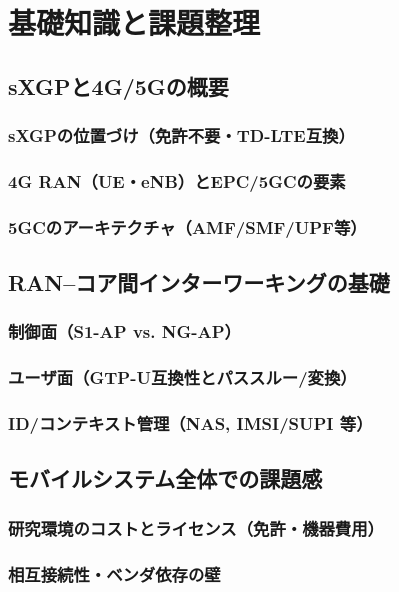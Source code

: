 \chapter{基礎知識と課題整理}
\label{chap:background}

\section{sXGPと4G/5Gの概要}
\subsection{sXGPの位置づけ（免許不要・TD-LTE互換）}
\subsection{4G RAN（UE・eNB）とEPC/5GCの要素}
\subsection{5GCのアーキテクチャ（AMF/SMF/UPF等）}

\section{RAN–コア間インターワーキングの基礎}
\subsection{制御面（S1-AP vs. NG-AP）}
\subsection{ユーザ面（GTP-U互換性とパススルー/変換）}
\subsection{ID/コンテキスト管理（NAS, IMSI/SUPI 等）}

\section{モバイルシステム全体での課題感}
\subsection{研究環境のコストとライセンス（免許・機器費用）}
\subsection{相互接続性・ベンダ依存の壁}
